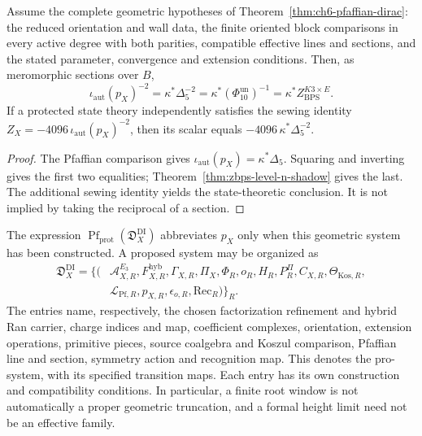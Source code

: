 \begin{theorem}
\label{thm:zbps-square-root-consequence}
Assume the complete geometric hypotheses of
Theorem~\ref{thm:ch6-pfaffian-dirac}: the reduced orientation and
wall data, the finite oriented block comparisons in every active
degree with both parities, compatible effective lines and sections,
and the stated parameter, convergence and extension conditions.
Then, as meromorphic sections over \(B\),
\begin{equation}\label{eq:zbps-square-root}
 \iota_{\mathrm{aut}}(p_X)^{-2}
 =\kappa^*\Delta_5^{-2}
 =\kappa^*(\Phi_{10}^{\mathrm{un}})^{-1}
 =\kappa^*Z_{\mathrm{BPS}}^{K3\times E}.
\end{equation}
If a protected state theory independently satisfies the sewing
identity \(Z_X=-4096\,\iota_{\mathrm{aut}}(p_X)^{-2}\), then
its scalar equals \(-4096\,\kappa^*\Delta_5^{-2}\).
\end{theorem}
\begin{proof}
The Pfaffian comparison gives
\(\iota_{\mathrm{aut}}(p_X)=\kappa^*\Delta_5\).
Squaring and inverting gives the first two equalities;
Theorem~\ref{thm:zbps-level-n-shadow} gives the last.
The additional sewing identity yields the state-theoretic
conclusion.  It is not implied by taking the reciprocal of a
section.
\end{proof}

The expression \(\operatorname{Pf}_{\mathrm{prot}}
(\mathfrak D_X^{\mathrm{DI}})\) abbreviates \(p_X\) only when
this geometric system has been constructed.  A proposed system
may be organized as
\begin{equation}\label{eq:zbps-dirac-igusa-pro-object}
\begin{split}
 \mathfrak D_X^{\mathrm{DI}}=\bigl\{\bigl(&
 \mathcal A^{E_3}_{X,R},F^{\mathrm{hyb}}_{X,R},\Gamma_{X,R},\Pi_X,
 \Phi_R,o_R,H_R,P_R^\Pi,C_{X,R},\Theta_{\mathrm{Kos},R},\\
 &\mathscr L_{\mathrm{Pf},R},p_{X,R},\epsilon_{o,R},\mathrm{Rec}_R
 \bigr)\bigr\}_R.
\end{split}
\end{equation}
The entries name, respectively, the chosen factorization
refinement and hybrid Ran carrier, charge indices and map,
coefficient complexes, orientation, extension operations,
primitive pieces, source coalgebra and Koszul comparison,
Pfaffian line and section, symmetry action and recognition map.
This denotes the pro-system, with its specified transition maps.
Each entry has its own construction and compatibility conditions.
In particular, a finite root window is not automatically a
proper geometric truncation, and a formal height limit need not
be an effective family.

